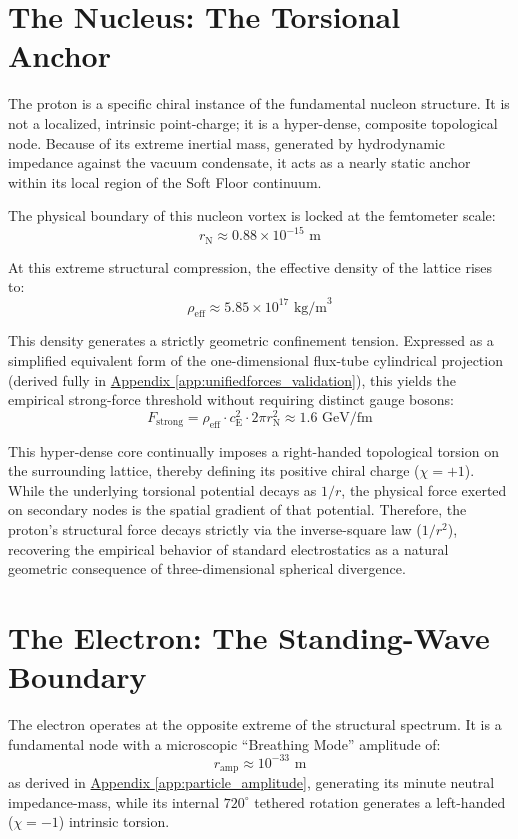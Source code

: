 \section{The Nucleus: The Torsional Anchor}
The proton is a specific chiral instance of the fundamental nucleon structure. It is not a localized, intrinsic point-charge; it is a hyper-dense, composite topological node. Because of its extreme inertial mass, generated by hydrodynamic impedance against the vacuum condensate, it acts as a nearly static anchor within its local region of the Soft Floor continuum.

The physical boundary of this nucleon vortex is locked at the femtometer scale:
\begin{equation}
    r_{\mathrm{N}} \approx 0.88 \times 10^{-15} \text{ m}
\end{equation}

At this extreme structural compression, the effective density of the lattice rises to:
\begin{equation}
    \rho_{\mathrm{eff}} \approx 5.85 \times 10^{17} \text{ kg/m}^3
\end{equation}

This density generates a strictly geometric confinement tension. Expressed as a simplified equivalent form of the one-dimensional flux-tube cylindrical projection (derived fully in \hyperref[app:unifiedforces_validation]{Appendix \ref*{app:unifiedforces_validation}}), this yields the empirical strong-force threshold without requiring distinct gauge bosons:
\begin{equation}
    F_{\mathrm{strong}} = \rho_{\mathrm{eff}} \cdot c_{\mathrm{E}}^2 \cdot 2\pi r_{\mathrm{N}}^2 \approx 1.6 \text{ GeV/fm}
\end{equation}

This hyper-dense core continually imposes a right-handed topological torsion on the surrounding lattice, thereby defining its positive chiral charge ($\chi=+1$). While the underlying torsional potential decays as $1/r$, the physical force exerted on secondary nodes is the spatial gradient of that potential. Therefore, the proton's structural force decays strictly via the inverse-square law ($1/r^2$), recovering the empirical behavior of standard electrostatics as a natural geometric consequence of three-dimensional spherical divergence.

\section{The Electron: The Standing-Wave Boundary}
The electron operates at the opposite extreme of the structural spectrum. It is a fundamental node with a microscopic ``Breathing Mode'' amplitude of:
\begin{equation}
    r_{\mathrm{amp}} \approx 10^{-33} \text{ m}
\end{equation}
as derived in \hyperref[app:particle_amplitude]{Appendix \ref*{app:particle_amplitude}}, generating its minute neutral impedance-mass, while its internal $720^{\circ}$ tethered rotation generates a left-handed ($\chi=-1$) intrinsic torsion.

